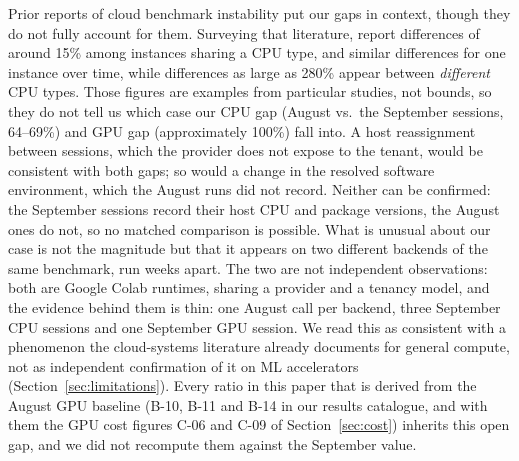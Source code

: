 Prior reports of cloud benchmark instability put our gaps in context,
though they do not fully account for them. Surveying that literature,
\citet{bulej2020duet} report differences of around 15\% among
instances sharing a CPU type, and similar differences for one instance
over time, while differences as large as 280\% appear between
\emph{different} CPU types. Those figures are examples from particular
studies, not bounds, so they do not tell us which case our CPU gap
(August vs.\ the September sessions, 64--69\%) and GPU gap
(approximately 100\%) fall into. A host reassignment between sessions,
which the provider does not expose to the tenant, would be consistent
with both gaps; so would a change in
the resolved software environment, which the August runs did not
record. Neither can be confirmed: the September sessions record their
host CPU and package versions, the August ones do not, so no matched
comparison is possible.
What is unusual about
our case is not the magnitude but that it appears on two different
backends of the same benchmark, run weeks apart. The two are not
independent observations: both are Google Colab runtimes, sharing a
provider and a tenancy model, and the evidence behind them is thin:
one August call per backend, three September CPU sessions and one
September GPU session. We read this as consistent with a phenomenon
the cloud-systems literature already documents for general compute,
not as independent confirmation of it on ML accelerators
(Section~\ref{sec:limitations}). Every ratio in this paper that is
derived from the August GPU baseline (B-10, B-11 and B-14 in our
results catalogue, and with them the GPU cost figures C-06 and C-09 of
Section~\ref{sec:cost}) inherits this open gap, and we did not recompute them against
the September value.
